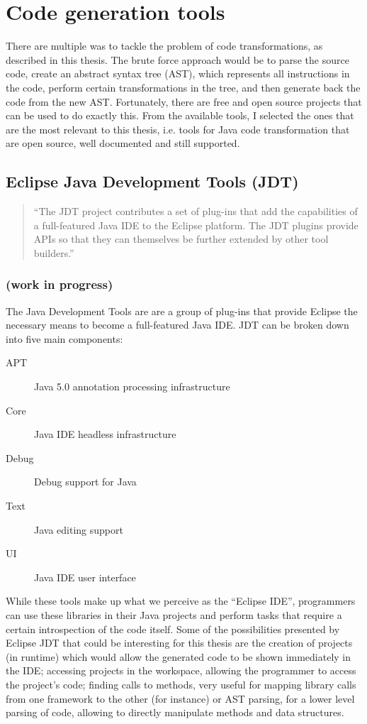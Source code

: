 \section{Code generation tools}
	There are multiple was to tackle the problem of code transformations, as described in this thesis. The brute force approach would be to parse the source code, create an abstract syntax tree (AST), which represents all instructions in the code, perform certain transformations in the tree, and then generate back the code from the new AST. Fortunately, there are free and open source projects that can be used to do exactly this. From the available tools, I selected the ones that are the most relevant to this thesis, i.e. tools for Java code transformation that are open source, well documented and still supported. 

\subsection{Eclipse Java Development Tools (JDT)}

\begin{quote}
	``The JDT project contributes a set of plug-ins that add the capabilities of a full-featured Java IDE to the Eclipse platform. The JDT plugins provide APIs so that they can themselves be further extended by other tool builders.'' \cite{eclipseJDT}
\end{quote}
	
	\subsubsection{(work in progress)}

	The Java Development Tools are are a group of plug-ins that provide Eclipse the necessary means to become a full-featured Java IDE. JDT can be broken down into five main components: 

	\begin{description}
		\item[APT] Java 5.0 annotation processing infrastructure
		\item[Core] Java IDE headless infrastructure
		\item[Debug] Debug support for Java
		\item[Text] Java editing support
		\item[UI] Java IDE user interface 
	\end{description}

	While these tools make up what we perceive as the ``Eclipse IDE'', programmers can use these libraries in their Java projects and perform tasks that require a certain introspection of the code itself. Some of the possibilities presented by Eclipse JDT that could be interesting for this thesis are the creation of projects (in runtime) which would allow the generated code to be shown immediately in the IDE; accessing projects in the workspace, allowing the programmer to access the project's code; finding calls to methods, very useful for mapping library calls from one framework to the other (for instance) or AST parsing, for a lower level parsing of code, allowing to directly manipulate methods and data structures.


